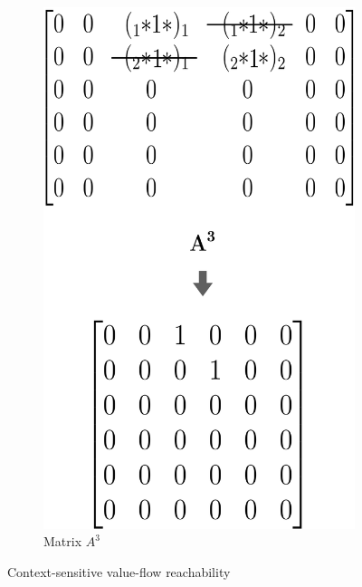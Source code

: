 \documentclass[xcolor=table,english]{beamer}
\begin{document}
\begin{frame}[fragile]
\begin{figure}
\begin{subfigure}[b]{0.297\textwidth}
            \includegraphics[width=\textwidth]{figures/cfpq_3.png}
            \caption{Matrix $A^3$}
        \end{subfigure}
        \caption{Context-sensitive value-flow reachability}
    \end{figure}
\end{frame}
\end{document}
